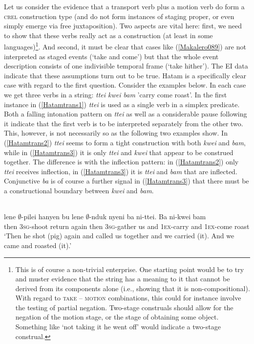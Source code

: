 Let us consider the evidence that a transport verb plus a motion verb do form a \textsc{crel} construction type (and do not form instances of staging proper, or even simply emerge via free juxtaposition). Two aspects are vital here: first, we need to show that these verbs really act as a construction (at least in some languages)\footnote{This is of course a non-trivial enterprise. One starting point would be to try and muster evidence that the string has a meaning to it that cannot be derived from its components alone (i.e., showing that it is non-compositional). With regard to \textsc{take} -- \textsc{motion} combinations, this could for instance involve the testing of partial negation. Two-stage construals should allow for the negation of the motion stage, or the stage of obtaining some object. Something like `not taking it he went off' would indicate a two-stage construal.}. And second, it must be clear that cases like (\ref{Makalero089}) are not interpreted as staged events (`take and come') but that the whole event description consists of one indivisible temporal frame (`take hither'). The EI data indicate that these assumptions turn out to be true. Hatam is a specifically clear case with regard to the first question. Consider the examples below. In each case we get three verbs in a string: \textit{ttei kwei bam} 'carry come roast'. In the first instance in (\ref{Hatamtrans1}) \textit{ttei} is used as a single verb in a simplex predicate. Both a falling intonation pattern on \textit{ttei} as well as a considerable pause following it indicate that the first verb is to be interpreted separately from the other two. This, however, is not necessarily so as the following two examples show. In (\ref{Hatamtrans2}) \textit{ttei} seems to form a tight construction with both \textit{kwei} and \textit{bam}, while in (\ref{Hatamtrans3}) it is only \textit{ttei} and \textit{kwei} that appear to be construed together. The difference is with the inflection pattern: in (\ref{Hatamtrans2}) only \textit{ttei} receives inflection, in (\ref{Hatamtrans3}) it is \textit{ttei} and \textit{bam} that are inflected. Conjunctive \textit{ba} is of course a further signal in (\ref{Hatamtrans3}) that there must be a constructional boundary between \textit{kwei} and \textit{bam}.

\a \label{Hatamtrans1}
\\
\gll lene $\emptyset$-pilei hanyen bu lene $\emptyset$-nduk nyeni ba ni-ttei. Ba ni-kwei bam \\
then \textsc{3}\textsc{sg}-shoot return again then \textsc{3}\textsc{sg}-gather us and \textsc{1}\textsc{ex}-carry and \textsc{1}\textsc{ex}-come roast \\
\glft `Then he shot (pig) again and called us together and we carried (it). And we came and roasted (it).' \\
\z

